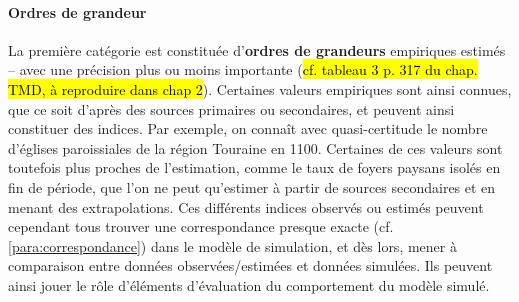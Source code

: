 \paragraph{Ordres de grandeur}
La première catégorie est constituée d'\textbf{ordres de grandeurs} empiriques estimés -- avec une précision plus ou moins importante (\hl{cf. tableau 3 p. 317 du chap. TMD, à reproduire dans chap 2}).
Certaines valeurs empiriques sont ainsi connues, que ce soit d'après des sources primaires ou secondaires, et peuvent ainsi constituer des indices.
Par exemple, on connaît avec quasi-certitude le nombre d'églises paroissiales de la région Touraine en 1100.
Certaines de ces valeurs sont toutefois plus proches de l'estimation, comme le taux de foyers paysans isolés en fin de période, que l'on ne peut qu'estimer à partir de sources secondaires et en menant des extrapolations.
Ces différents indices observés ou estimés peuvent cependant tous trouver une correspondance presque exacte (cf. \cref{para:correspondance}) dans le modèle de simulation, et dès lors, mener à comparaison entre données observées/estimées et données simulées.
Ils peuvent ainsi jouer le rôle d'éléments d'évaluation du comportement du modèle simulé.

